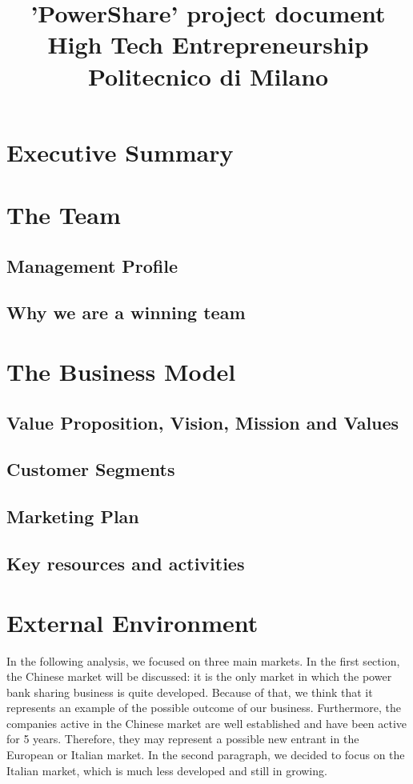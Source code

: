 \documentclass[12pt]{article}
\begin{document}
\title{%
  'PowerShare' project document \\
  \large High Tech Entrepreneurship \\
  Politecnico di Milano \\
}
\graphicspath{ {./images/} }
\maketitle
\tableofcontents

\newpage
    \section{Executive Summary}
    \section{The Team}
        \subsection{Management Profile}
        \subsection{Why we are a winning team}
    \section{The Business Model}
        \subsection{Value Proposition, Vision, Mission and Values}
        \subsection{Customer Segments}
        \subsection{Marketing Plan}
        \subsection{Key resources and activities}
    \newpage
    \section{External Environment}
        In the following analysis, we focused on three main markets. In the first section, 
        the Chinese market will be discussed: it is the only market in which the power bank sharing business is quite developed. 
        Because of that, we think that it represents an example of the possible outcome of our business. 
        Furthermore, the companies active in the Chinese market are well established and have been active for 5 years. 
        Therefore, they may represent a possible new entrant in the European or Italian market.  
        In the second paragraph, we decided to focus on the Italian market, which is much less developed and still in growing.  
        
\end{document}
